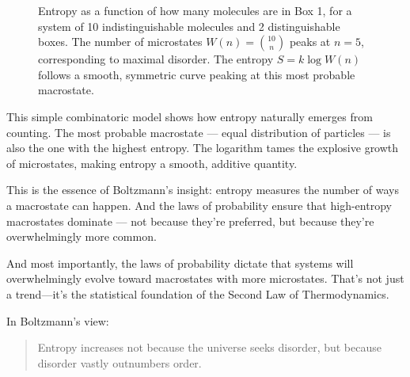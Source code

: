\begin{figure}[H]
\centering
{}
\caption{
Entropy as a function of how many molecules are in Box 1, for a system of 10 indistinguishable molecules and 2 distinguishable boxes. The number of microstates \( W(n) = \binom{10}{n} \) peaks at \( n = 5 \), corresponding to maximal disorder. The entropy \( S = k \log W(n) \) follows a smooth, symmetric curve peaking at this most probable macrostate.
}
\end{figure}


This simple combinatoric model shows how entropy naturally emerges from counting. The most probable macrostate — equal distribution of particles — is also the one with the highest entropy. The logarithm tames the explosive growth of microstates, making entropy a smooth, additive quantity.

This is the essence of Boltzmann’s insight: entropy measures the number of ways a macrostate can happen. And the laws of probability ensure that high-entropy macrostates dominate — not because they’re preferred, but because they’re overwhelmingly more common.




And most importantly, the laws of probability dictate that systems will overwhelmingly evolve toward macrostates with more microstates. That’s not just a trend—it’s the statistical foundation of the Second Law of Thermodynamics.

In Boltzmann’s view:
\begin{quote}
Entropy increases not because the universe seeks disorder, but because disorder vastly outnumbers order.
\end{quote}

